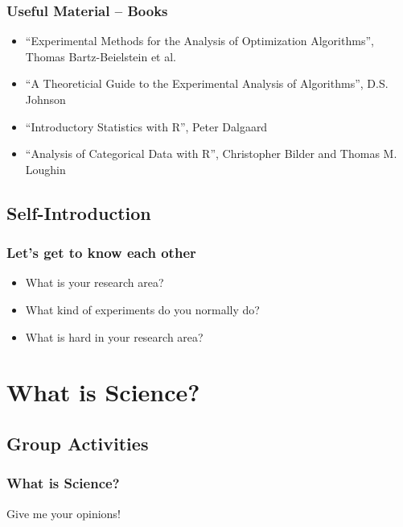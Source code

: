 \documentclass{beamer}
\begin{document}
\begin{frame}
  \frametitle{Useful Material -- Books}
  \begin{itemize}
  \item ``Experimental Methods for the Analysis of Optimization
    Algorithms'', Thomas Bartz-Beielstein et al.
  \item ``A Theoreticial Guide to the Experimental Analysis of
    Algorithms'', D.S. Johnson

    \medskip

  \item ``Introductory Statistics with R'', Peter Dalgaard
  \item ``Analysis of Categorical Data with R'', Christopher Bilder
    and Thomas M. Loughin
  \end{itemize}
\end{frame}

\subsection{Self-Introduction}

\begin{frame}
  \frametitle{Let's get to know each other}
  \begin{itemize}
  \item What is your research area?
    \vfill
  \item What kind of experiments do you normally do?
    \vfill
  \item What is hard in your research area?
  \end{itemize}
\end{frame}

\section{What is Science?}
\subsection{Group Activities}
\begin{frame}
  \frametitle{What is Science?}
  \begin{center}
    {Give me your opinions!}
    \vfill
  \end{center}
\end{frame}
\end{document}
